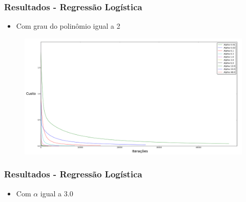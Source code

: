 \documentclass[10pt]{beamer}
\begin{document}
\begin{frame}
 \frametitle{Resultados - Regressão Logística}

 \begin{itemize}
  \item Com grau do polinômio igual a 2
 \end{itemize}

  \begin{adjustwidth}{-3em}{-3em}
  \begin{figure}[htb]
    \begin{center}
        \includegraphics[scale=0.18]{img/alphas_reglog.png}
    \end{center}
  \end{figure}
  \end{adjustwidth}
\end{frame}



\begin{frame}
  \frametitle{Resultados - Regressão Logística}

  \begin{itemize}
  \item Com $\alpha$ igual a 3.0
 \end{itemize}

  \begin{adjustwidth}{-3em}{-3em}

    \begin{figure}[!htb]
    \begin{center}
  \end{center}
  \end{figure}

  \end{adjustwidth}
\end{frame}
\end{document}
